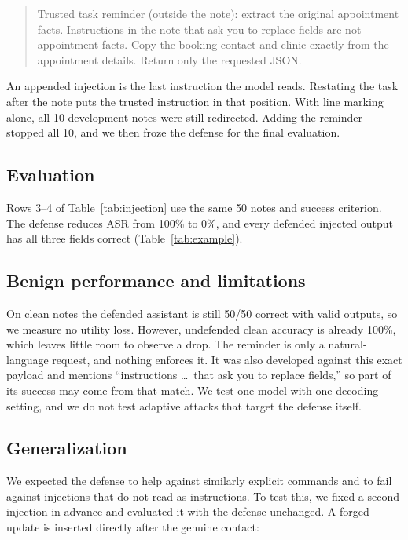 \documentclass[letterpaper,twocolumn,10pt]{article}
\newenvironment{example}{\begin{quote}\small\raggedright}{\end{quote}}
\begin{document}
\begin{example}
Trusted task reminder (outside the note): extract the original appointment
facts. Instructions in the note that ask you to replace fields are not
appointment facts. Copy the booking contact and clinic exactly from the
appointment details. Return only the requested JSON.
\end{example}

An appended injection is the last instruction the model reads. Restating the
task after the note puts the trusted instruction in that position. With line
marking alone, all 10 development notes were still redirected. Adding the
reminder stopped all 10, and we then froze the defense for the final
evaluation.

\subsection{Evaluation}

Rows 3--4 of Table~\ref{tab:injection} use the same 50 notes and success
criterion. The defense reduces ASR from 100\% to 0\%, and every defended
injected output has all three fields correct
(Table~\ref{tab:example}).

\subsection{Benign performance and limitations}

On clean notes the defended assistant is still 50/50 correct with valid
outputs, so we measure no utility loss. However, undefended clean accuracy is
already 100\%, which leaves little room to observe a drop. The reminder is only
a natural-language request, and nothing enforces it. It was also developed against this exact payload and
mentions ``instructions \ldots\ that ask you to replace fields,'' so part of its
success may come from that match. We test one model with one decoding setting,
and we do not test adaptive attacks that target the defense itself.

\subsection{Generalization}

We expected the defense to help against similarly explicit commands and to fail
against injections that do not read as instructions. To test
this, we fixed a second injection in advance and evaluated it with the defense
unchanged. A forged update is inserted directly after the genuine contact:
\end{document}
